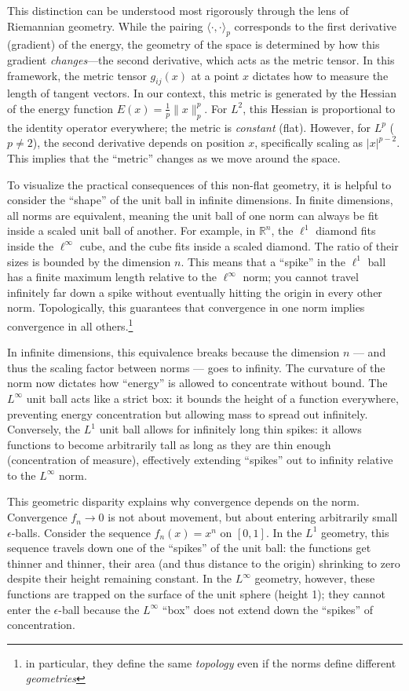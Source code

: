 \documentclass{article}
\newcommand{\R}{{\mathbb{R}}}
\begin{document}
This distinction can be understood most rigorously through the lens of Riemannian geometry. While the pairing
$\langle \cdot, \cdot \rangle_p$ corresponds to the first derivative (gradient) of the energy, the
geometry of the space is determined by how this gradient \emph{changes}---the second derivative,
which acts as the metric tensor. In this framework, the metric tensor $g_{ij}(x)$ at a point $x$ dictates how
to measure the length of tangent vectors. In our context, this metric is generated by the Hessian of the
energy function $E(x) = \frac{1}{p}\|x\|_p^p$. For $L^2$, this Hessian is proportional to the identity
operator everywhere; the metric is \emph{constant} (flat). However, for $L^p$ ($p \ne 2$), the second
derivative depends on position $x$, specifically scaling as $|x|^{p-2}$. This implies that the ``metric''
changes as we move around the space.

To visualize the practical consequences of this non-flat geometry, it is helpful to consider the ``shape'' of
the unit ball in infinite dimensions. In finite dimensions, all norms are equivalent, meaning the unit ball of
one norm can always be fit inside a scaled unit ball of another. For example, in $\R^n$, the $\ell^1$ diamond
fits inside the $\ell^\infty$ cube, and the cube fits inside a scaled diamond. The ratio of their sizes is
bounded by the dimension $n$. This means that a ``spike'' in the $\ell^1$ ball has a finite maximum length
relative to the $\ell^\infty$ norm; you cannot travel infinitely far down a spike without eventually hitting
the origin in every other norm. Topologically, this guarantees that convergence in one norm implies
convergence in all others.\footnote{in particular, they define the same \emph{topology} even if the norms
define different \emph{geometries}}

In infinite dimensions, this equivalence breaks because the dimension $n$ --- and thus the scaling factor
between norms --- goes to infinity. The curvature of the norm now dictates how ``energy'' is allowed to
concentrate without bound. The $L^\infty$ unit ball acts like a strict box: it bounds the height of a function
everywhere, preventing energy concentration but allowing mass to spread out infinitely. Conversely, the $L^1$
unit ball allows for infinitely long thin spikes: it allows functions to become arbitrarily tall as long as
they are thin enough (concentration of measure), effectively extending ``spikes'' out to infinity relative to
the $L^\infty$ norm.

This geometric disparity explains why convergence depends on the norm. Convergence $f_n \to 0$ is not about
movement, but about entering arbitrarily small $\epsilon$-balls. Consider the sequence $f_n(x) = x^n$ on
$[0,1]$. In the $L^1$ geometry, this sequence travels down one of the ``spikes'' of the unit ball: the functions get
thinner and thinner, their area (and thus distance to the origin) shrinking to zero despite their height
remaining constant. In the $L^\infty$ geometry, however, these functions are trapped on the surface of the unit
sphere (height 1); they cannot enter the $\epsilon$-ball because the $L^\infty$ ``box'' does not extend down
the ``spikes'' of concentration.
\end{document}
